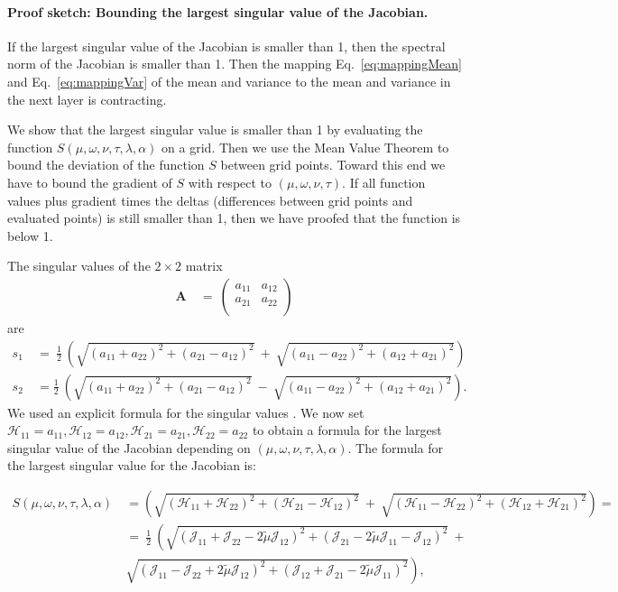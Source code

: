 \documentclass{article}
\newcommand\BA{\bm{A}}
\newcommand\munn{{\tilde \mu}}
\begin{document}
\paragraph{Proof sketch: Bounding the largest singular value of the Jacobian.}

If the largest singular value of the Jacobian is smaller than 1, then
the spectral norm of the Jacobian is smaller than 1.
Then the mapping  Eq.~\eqref{eq:mappingMean} 
and Eq.~\eqref{eq:mappingVar} 
of the mean and variance to the mean and variance in the next layer is contracting.



We show that the largest singular value is smaller than 1 by
evaluating the function
$S(\mu, \omega, \nu, \tau, \lambda, \alpha)$ on a grid.
Then we use the Mean Value Theorem to bound the deviation of the
function $S$ between grid points. 
Toward this end we have to bound the gradient of $S$ with respect to
$(\mu, \omega, \nu, \tau)$. If all function values plus
gradient times the deltas (differences between grid points and evaluated
points) is still smaller than 1, then we have proofed that the
function is below 1. 

The singular values of the $2 \times2$ matrix
\begin{align}
\BA \ &= \ \left(
\begin{array}{cc}
 a_{11} & a_{12} \\
 a_{21} & a_{22} \\
\end{array}
\right)
\end{align}
are
\begin{align}
s_1 \ &= \ \frac{1}{2} \
\left(\sqrt{(a_{11}+a_{22})^2+(a_{21}-a_{12})^2} \ + \
\sqrt{(a_{11}-a_{22})^2+(a_{12}+a_{21})^2}\right) \\
s_2 &= \frac{1}{2} \ 
\left(\sqrt{(a_{11}+a_{22})^2+(a_{21}-a_{12})^2} \ - \
\sqrt{(a_{11}-a_{22})^2+(a_{12}+a_{21})^2}\right).
\end{align}
We used an explicit formula for the singular values \citep{Blinn:96}. We now set 
${\mathcal H}_{11}=a_{11},{\mathcal H}_{12}=a_{12},{\mathcal H}_{21}=a_{21},{\mathcal H}_{22}=a_{22}$
to obtain a formula for the largest singular value of the Jacobian
depending on $(\mu,\omega,\nu,\tau,\lambda ,\alpha )$.
The formula for the largest singular value for the Jacobian is: 

\begin{align}
\label{eq:S}
 S(\mu,\omega,\nu,\tau,\lambda ,\alpha ) \ &= \left(\sqrt{({\mathcal H}_{11}+{\mathcal H}_{22})^2+({\mathcal H}_{21}-{\mathcal H}_{12})^2} \ + \ \sqrt{({\mathcal H}_{11}-{\mathcal H}_{22})^2+({\mathcal H}_{12}+{\mathcal H}_{21})^2}\right) = \\ \nonumber
&=\ \frac{1}{2} \ \left(\sqrt{({\mathcal J}_{11}+{\mathcal J}_{22} - 2 \munn {\mathcal J}_{12})^2+({\mathcal J}_{21} - 2 \munn {\mathcal J}_{11}-{\mathcal J}_{12})^2} \ + \right. \\ \nonumber
& \left. \sqrt{({\mathcal J}_{11}-{\mathcal J}_{22} + 2 \munn {\mathcal J}_{12})^2+({\mathcal J}_{12}+{\mathcal J}_{21} - 2 \munn {\mathcal J}_{11})^2} \right), \\ \nonumber 
\end{align}
\end{document}
